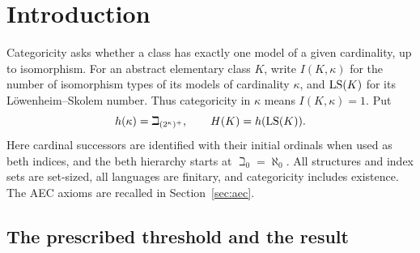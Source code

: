 \begin{abstract}
Assuming the continuum hypothesis, we construct an abstract elementary
class with L\"owenheim--Skolem number \(\aleph_0\) that is categorical in
every sufficiently large cardinal but has at least two nonisomorphic
models of cardinality \(\beth_{\omega_2}\).
Thus categoricity does not transfer down to the proposed bound
\(\beth_{(2^{\aleph_0})^+}\), which equals \(\beth_{\omega_2}\) under CH.
Consequently, if ZFC is consistent, the prescribed-threshold
form of Shelah's categoricity conjecture is not provable in ZFC.
\end{abstract}

\section{Introduction}\label{sec:introduction}

Categoricity asks whether a class has exactly one model of a given
cardinality, up to isomorphism. For an abstract elementary class \(K\),
write \(I(K,\kappa)\) for the number of isomorphism types of its models
of cardinality \(\kappa\), and \(\operatorname{LS}(K)\) for its
L\"owenheim--Skolem number. Thus categoricity in \(\kappa\) means
\(I(K,\kappa)=1\). Put
\begin{equation}\label{eq:hanf-function}
 h(\kappa)=\beth_{(2^\kappa)^+},\qquad H(K)=h(\operatorname{LS}(K)).
\end{equation}
Here cardinal successors are identified with their initial ordinals when
used as beth indices, and the beth hierarchy starts at
\(\beth_0=\aleph_0\). All structures and index sets are set-sized, all
languages are finitary, and categoricity includes existence.
The AEC axioms are recalled in Section~\ref{sec:aec}.

\subsection{The prescribed threshold and the result}

